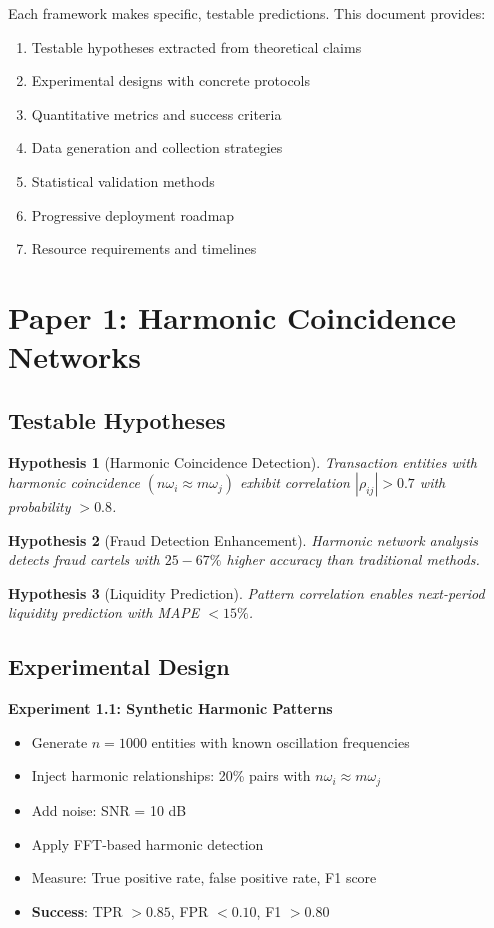\documentclass[12pt]{article}
\newtheorem{hypothesis}{Hypothesis}
\begin{document}
Each framework makes specific, testable predictions. This document provides:
\begin{enumerate}
    \item Testable hypotheses extracted from theoretical claims
    \item Experimental designs with concrete protocols
    \item Quantitative metrics and success criteria
    \item Data generation and collection strategies
    \item Statistical validation methods
    \item Progressive deployment roadmap
    \item Resource requirements and timelines
\end{enumerate}

\section{Paper 1: Harmonic Coincidence Networks}

\subsection{Testable Hypotheses}

\begin{hypothesis}[Harmonic Coincidence Detection]
Transaction entities with harmonic coincidence $(n\omega_i \approx m\omega_j)$ exhibit correlation $|\rho_{ij}| > 0.7$ with probability $> 0.8$.
\end{hypothesis}

\begin{hypothesis}[Fraud Detection Enhancement]
Harmonic network analysis detects fraud cartels with $25-67\%$ higher accuracy than traditional methods.
\end{hypothesis}

\begin{hypothesis}[Liquidity Prediction]
Pattern correlation enables next-period liquidity prediction with MAPE $< 15\%$.
\end{hypothesis}

\subsection{Experimental Design}

\textbf{Experiment 1.1: Synthetic Harmonic Patterns}
\begin{itemize}
    \item Generate $n=1000$ entities with known oscillation frequencies
    \item Inject harmonic relationships: 20\% pairs with $n\omega_i \approx m\omega_j$
    \item Add noise: SNR = 10 dB
    \item Apply FFT-based harmonic detection
    \item Measure: True positive rate, false positive rate, F1 score
    \item \textbf{Success}: TPR $> 0.85$, FPR $< 0.10$, F1 $> 0.80$
\end{itemize}
\end{document}
